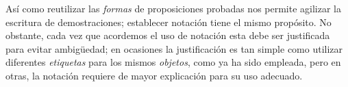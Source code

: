 \documentclass[11pt]{article}
\begin{document}
%

Así como reutilizar las \textit{formas} de proposiciones probadas nos permite agilizar la escritura de demostraciones; establecer notación tiene el mismo propósito. No obstante, cada vez que acordemos el uso de notación esta debe ser justificada para evitar ambigüedad; en ocasiones la justificación es tan simple como utilizar diferentes \textit{etiquetas} para los mismos \textit{objetos}, como ya ha sido empleada, pero en otras, la notación requiere de mayor explicación para su uso adecuado.%
\end{document}
